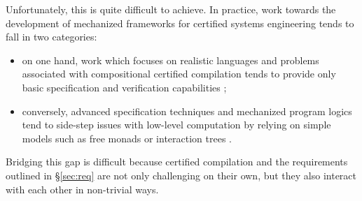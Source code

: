 \documentclass[acmsmall,screen,review,anonymous]{acmart}
\begin{document}
Unfortunately, this is quite difficult to achieve.
In practice,
work towards the development of
mechanized frameworks for certified systems engineering
tends to fall in two categories:
\begin{itemize}
  \item on one hand,
    work which focuses on realistic languages and
    problems associated with compositional certified compilation
    tends to provide only basic specification and
    verification capabilities
    \cite{compcompcert,compcertm,compcerto};
  \item conversely,
    advanced specification techniques
    and mechanized program logics
    tend to side-step issues with low-level computation
    by relying on simple models
    such as free monads or interaction trees
    \cite{rbgs-cal,popl22,ccr}.
\end{itemize}
Bridging this gap is difficult because
certified compilation and
the requirements outlined in \S\ref{sec:req}
are not only challenging on their own,
but they also interact with each other in non-trivial ways.

\end{document}
